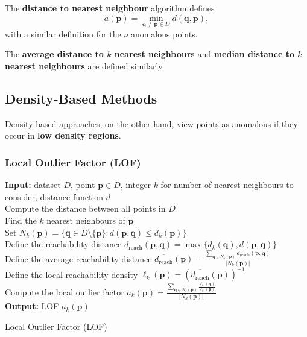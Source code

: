 The \textbf{distance to nearest neighbour} algorithm defines 
$$
a(\mathbf{p}) 
= \min_{\mathbf{q}\neq \mathbf{p} \in D} d(\mathbf{q}, \mathbf{p}),
$$
with a similar definition for the $\nu$ anomalous points. 

The \textbf{average distance to $k$ nearest neighbours} and \textbf{median distance to $k$ nearest neighbours} are defined similarly. 

\subsection{Density-Based Methods} %

Density-based approaches, on the other hand, view points as anomalous if they occur in \textbf{low density regions}.

\subsubsection*{Local Outlier Factor (LOF)} %

\begin{algorithm}[ht]
\SetAlgoLined
\textbf{Input:} dataset $D$, point $\mathbf{p} \in D$, integer $k$ for number of nearest neighbours to consider, distance function $d$
\\ Compute the distance between all points in $D$
\\
Find the $k$ nearest neighbours of $\mathbf{p}$ 
\\ Set $N_k(\mathbf{p}) = \{ \mathbf{q} \in D \setminus \{\mathbf{p}\} : d(\mathbf{p}, \mathbf{q}) \leq d_k(\mathbf{p}) \}$
\\ Define the reachability distance
$d_{\text{reach}}(\mathbf{p},\mathbf{q}) = \max\{d_k(\mathbf{q}), d(\mathbf{p},\mathbf{q})\}$
\\ Define the average reachability distance $\overline{d_{\text{reach}}}(\mathbf{p}) 
= \frac{\sum_{\mathbf{q} \in N_k(\mathbf{p})} d_{\text{reach}}(\mathbf{p},\mathbf{q})}{\lvert N_k(\mathbf{p}) \rvert}$
\\Define the local reachability density
$\ell_k(\mathbf{p}) = \left( \overline{d_{\text{reach}}}(\mathbf{p}) \right)^{-1}$
\\Compute the local outlier factor
$a_k(\mathbf{p})
= \frac{\sum_{\mathbf{q} \in N_k(\mathbf{p})} \frac{\ell_k(\mathbf{q})}{\ell_k(\mathbf{p})}}{\lvert N_k(\mathbf{p}) \rvert}$
\\ \textbf{Output:} LOF $a_k(\mathbf{p})$
\caption{Local Outlier Factor (LOF)}
\label{alg:LOF}
\end{algorithm}

